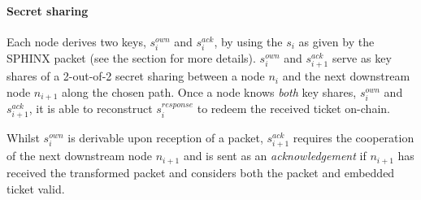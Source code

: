 




\paragraph{Secret sharing}
\label{sec:incentives:proofofrelay:secretSharing}

Each node derives two keys, $s_i^{own}$ and $s_i^{ack}$, by using the $s_i$ as given by the SPHINX packet (see the  section for more details). $s_i^{own}$ and $s_{i+1}^{ack}$ serve as key shares of a 2-out-of-2 secret sharing between a node $n_i$ and the next downstream node $n_{i+1}$ along the chosen path. Once a node knows \textit{both} key shares, $s_i^{own}$ and $s_{i+1}^{ack}$, it is able to reconstruct $s_i^{response}$ to redeem the received ticket on-chain.

Whilst $s_i^{own}$ is derivable upon reception of a packet, $s_{i+1}^{ack}$ requires the cooperation of the next downstream node $n_{i+1}$ and is sent as an \textit{acknowledgement} if $n_{i+1}$ has received the transformed packet and considers both the packet and embedded ticket valid.


